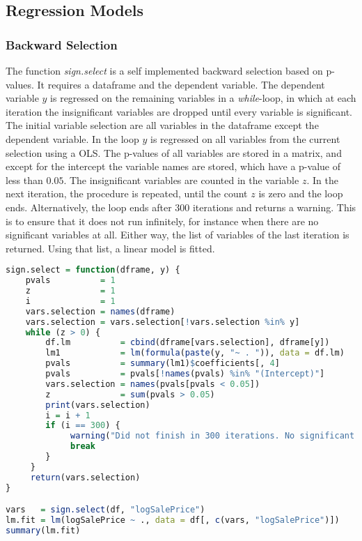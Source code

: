 \subsection{Regression Models}
\subsubsection{Backward Selection}
The function \textit{sign.select} is a self implemented backward selection based on p-values. It requires a dataframe and the dependent variable. The dependent variable $y$ is regressed on the remaining variables 
in a  \textit{while}-loop, in which at each iteration the insignificant variables
are dropped until every variable is significant. 
The initial variable selection are all variables in the dataframe except the dependent variable. 
In the loop $y$ is regressed on all variables from the current selection using a OLS. The p-values of all variables are stored in a matrix, and except
for the intercept the variable names are stored, which have a p-value
of less than $0.05$. The insignificant variables are counted in the variable $z$.  In the next iteration, the procedure is repeated,
until the count $z$  is zero and the loop
ends. Alternatively, the loop ends after 300 iterations and returns a warning. This is to ensure
that it does not run infinitely, for instance when there are no significant variables at all. 
Either way, the list of variables of the last iteration is returned. Using that list,  a linear model is fitted. 


\begin{lstlisting}[language=R]
sign.select = function(dframe, y) {
    pvals          = 1
    z              = 1
    i              = 1
    vars.selection = names(dframe)
    vars.selection = vars.selection[!vars.selection %in% y]
    while (z > 0) {
        df.lm          = cbind(dframe[vars.selection], dframe[y])
        lm1            = lm(formula(paste(y, "~ . ")), data = df.lm)
        pvals          = summary(lm1)$coefficients[, 4]
        pvals          = pvals[!names(pvals) %in% "(Intercept)"]
        vars.selection = names(pvals[pvals < 0.05])
        z              = sum(pvals > 0.05)
        print(vars.selection)
        i = i + 1
        if (i == 300) {
             warning("Did not finish in 300 iterations. No significant variables in data set?")
             break
        }
     }
     return(vars.selection)
}

vars   = sign.select(df, "logSalePrice")
lm.fit = lm(logSalePrice ~ ., data = df[, c(vars, "logSalePrice")])
summary(lm.fit)
\end{lstlisting}
